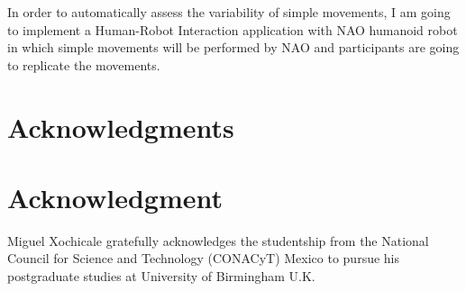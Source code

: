 \documentclass[9pt,journal,onecolumn,compsoc]{IEEEtran}
\begin{document}
In order to automatically assess the variability of simple movements, 
I am going to implement a Human-Robot Interaction application 
with NAO humanoid robot \cite{NAO}
in which simple movements will be performed by NAO 
and participants are going to replicate the movements.


\ifCLASSOPTIONcompsoc
  \section*{Acknowledgments}
\else
  \section*{Acknowledgment}
\fi

Miguel Xochicale gratefully acknowledges the studentship from 
the National Council for Science and Technology (CONACyT) Mexico
to pursue his postgraduate studies at University of Birmingham U.K.

\ifCLASSOPTIONcaptionsoff
  \newpage
\fi





%
%
%
% 
% 
\end{document}
